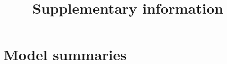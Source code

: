 \documentclass{article}
\title{Supplementary information}
\begin{document}
\maketitle

\section{Model summaries}



\end{document}
